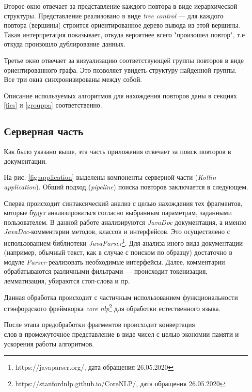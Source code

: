 Второе окно отвечает за представление каждого повтора в виде иерархической структуры.
Представление реализовано в виде \emph{tree control} --- для каждого повтора (вершины) строится ориентированное дерево вывода из этой вершины.
Такая интерпретация показывает, откуда вероятнее всего "произошел повтор", т.е откуда произошло дублирование данных.

Третье окно отвечает за визуализацию соответствующей группы повторов в  виде ориентированного графа.
Это позволяет увидеть структуру найденной группы. Все три окна синхронизированы между собой.

Описание используемых алгоритмов для нахождения повторов даны в секциях \ref{fics} и \ref{grouppa}  соответственно.    



\subsection{Серверная часть}\label{server}
Как было указано выше, эта часть приложения отвечает за поиск повторов в документации.

На рис. \ref{fig:application} выделены компоненты серверной части (\emph{Kotlin application}).
Общий подход (\emph{pipeline}) поиска повторов заключается в следующем.

Сперва происходит синтаксический анализ с целью нахождения тех фрагментов, которые будут анализироваться согласно выбранным параметрам, заданными пользователем.
В данной работе анализируются \emph{JavaDoc} документация, а именно \emph{JavaDoc}-комментарии методов, классов и интерфейсов.
Это осуществлено с использованием библиотеки \emph{JavaParser}\footnote{https://javaparser.org/, дата обращения 26.05.2020}.
Для анализа иного вида документации (например, обычный текст, как в случае с поиском по образцу) достаточно в модуле \emph{Parser} реализовать необходимые интерфейсы.
Далее, комментарии обрабатываются различными фильтрами --- происходит токенизация, лемматизация, убираются стоп-слова и пр.


Данная обработка происходит с частичным использованием функциональности стэнфордского  фреймворка \emph{core nlp}\footnote{https://stanfordnlp.github.io/CoreNLP/, дата обращения 26.05.2020} для обработки естественного языка.

После этапа предобработки фрагментов происходит конвертация \\слов  в промежуточное представление в виде чисел с целью экономии памяти и ускорения работы алгоритмов.

